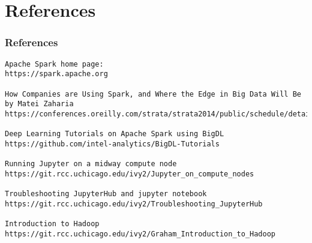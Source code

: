 \section{References}

\begin{frame}[fragile]
  \frametitle{References}

{\tiny
\begin{verbatim}
Apache Spark home page:
https://spark.apache.org

How Companies are Using Spark, and Where the Edge in Big Data Will Be
by Matei Zaharia
https://conferences.oreilly.com/strata/strata2014/public/schedule/detail/33057

Deep Learning Tutorials on Apache Spark using BigDL
https://github.com/intel-analytics/BigDL-Tutorials

Running Jupyter on a midway compute node
https://git.rcc.uchicago.edu/ivy2/Jupyter_on_compute_nodes

Troubleshooting JupyterHub and jupyter notebook
https://git.rcc.uchicago.edu/ivy2/Troubleshooting_JupyterHub

Introduction to Hadoop
https://git.rcc.uchicago.edu/ivy2/Graham_Introduction_to_Hadoop
\end{verbatim}
}

\end{frame}
